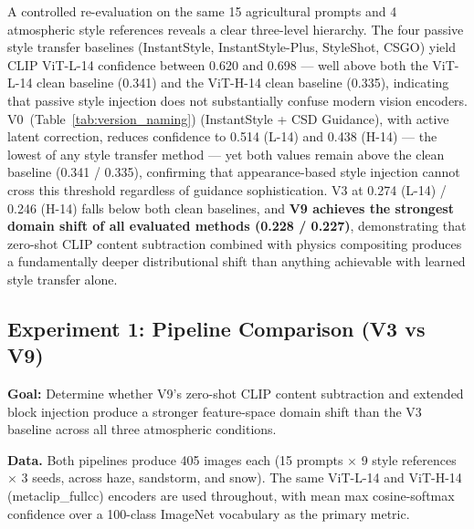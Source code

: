 \noindent A controlled re-evaluation on the same 15 agricultural prompts and 4 atmospheric style references reveals a clear three-level hierarchy. The four passive style transfer baselines (InstantStyle, InstantStyle-Plus, StyleShot, CSGO) yield CLIP ViT-L-14 confidence between 0.620 and 0.698 --- well above both the ViT-L-14 clean baseline (0.341) and the ViT-H-14 clean baseline (0.335), indicating that passive style injection does not substantially confuse modern vision encoders. V0~(Table~\ref{tab:version_naming}) (InstantStyle + CSD Guidance), with active latent correction, reduces confidence to 0.514 (L-14) and 0.438 (H-14) --- the lowest of any style transfer method --- yet both values remain above the clean baseline (0.341 / 0.335), confirming that appearance-based style injection cannot cross this threshold regardless of guidance sophistication. V3 at 0.274 (L-14) / 0.246 (H-14) falls below both clean baselines, and \textbf{V9 achieves the strongest domain shift of all evaluated methods (0.228 / 0.227)}, demonstrating that zero-shot CLIP content subtraction combined with physics compositing produces a fundamentally deeper distributional shift than anything achievable with learned style transfer alone.

\FloatBarrier
\subsection{Experiment 1: Pipeline Comparison (V3 vs V9)}
\label{sec:exp1}

\noindent \textbf{Goal:} Determine whether V9's zero-shot CLIP content subtraction and extended block injection produce a stronger feature-space domain shift than the V3 baseline across all three atmospheric conditions.

\noindent \textbf{Data.} Both pipelines produce 405 images each (15 prompts $\times$ 9 style references $\times$ 3 seeds, across haze, sandstorm, and snow). The same ViT-L-14 and ViT-H-14 (metaclip\_fullcc) encoders are used throughout, with mean max cosine-softmax confidence over a 100-class ImageNet vocabulary as the primary metric.

